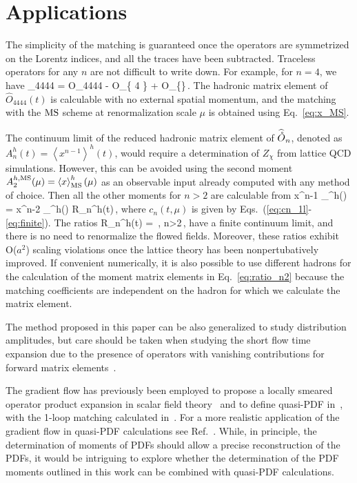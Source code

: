 \section{Applications}
The simplicity of the matching is guaranteed once the operators are symmetrized
on the Lorentz indices, and all the traces have been subtracted.
Traceless operators for any $n$ are not difficult to write down.
For example, for $n=4$, we have
\be
{}_{4444} = O_{4444} - O_{\left\{\alpha {} 4 \right\}}
+  O_{\left\{\alpha \alpha \beta \beta \right\}}\,.
\ee
The hadronic matrix element of $\widehat{O}_{4444}(t)$ is calculable
with no external spatial momentum, and the matching with the
$\text{MS}$ scheme at renormalization scale $\mu$ is obtained
using Eq.~\eqref{eq:x_MS}.

The continuum limit of the reduced hadronic matrix element of $\widehat{\mathring{O}}_n$,
denoted as $A_n^h(t) = \left\langle x^{n-1} \right\rangle^h(t)$,
would require a determination of $Z_\chi$ from lattice QCD simulations.
However, this can be avoided using the second moment
$A_2^{h,\text{MS}}(\mu) = \left\langle x \right\rangle_{\text{MS}}^h(\mu)$ as an
observable input already computed
with any method of choice. Then all the other moments for $n>2$
are calculable from
\be
\left\langle x^{n-1} \right\rangle_{\MS}^h(\mu) =
\left\langle x^{n-2} \right\rangle_{\MS}^h(\mu)
 R_n^h(t)\,,
\label{eq:ratio_n2}
\ee
where $c_n(t,\mu)$ is given by
Eqs.~(\ref{eq:cn_1l}-\ref{eq:finite}).
The ratios
\be
R_n^h(t) = \,,
\qquad n>2\,,
\label{eq:Rn}
\ee
have a finite continuum limit,
and there is no need to renormalize the flowed fields.
Moreover, these ratios exhibit O($a^2$) scaling violations
once the lattice theory has been nonpertubatively improved.
If convenient numerically, it is also possible to use different hadrons
for the calculation of the moment matrix elements in
Eq.~\eqref{eq:ratio_n2}
because the matching coefficients are independent on the hadron
for which we calculate the matrix element.

The method proposed in this paper can be
also generalized to study distribution amplitudes,
but care should be taken when studying the
short flow time expansion due to the presence of operators
with vanishing contributions for forward matrix
elements~\cite{Bali:2017ude,RQCD:2019osh}.

The gradient flow has previously been employed to propose a locally smeared
operator product expansion in scalar field theory~\cite{Monahan:2015lha}
and to define quasi-PDF in~\cite{Monahan:2016bvm},
with the 1-loop matching calculated in~\cite{Monahan:2017hpu}.
For a more realistic application of the gradient flow
in quasi-PDF calculations see Ref.~\cite{HadStruc:2022yaw}.
While, in principle, the determination of moments of PDFs
should allow a precise reconstruction of the PDFs,
it would be intriguing to explore whether the determination of the
PDF moments outlined in this work
can be combined with quasi-PDF calculations.
